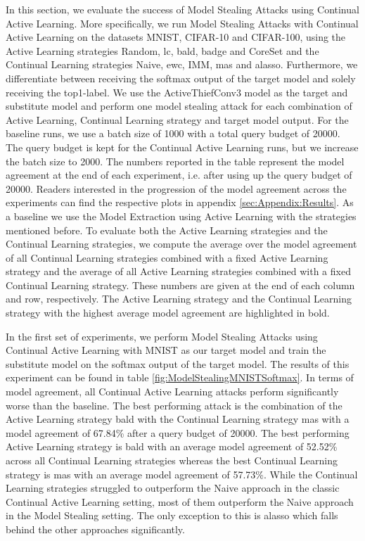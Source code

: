 In this section, we evaluate the success of Model Stealing Attacks using Continual Active Learning. More specifically, we run Model Stealing Attacks with Continual Active Learning on the datasets MNIST, CIFAR-10 and CIFAR-100, using the Active Learning strategies
Random, \gls{lc}, \gls{bald}, \gls{badge} and CoreSet and the Continual Learning strategies Naive, \gls{ewc}, IMM, \gls{mas} and \gls{alasso}. Furthermore, we differentiate between receiving the softmax output of the target model and solely receiving the top1-label. We use the ActiveThiefConv3 model
as the target and substitute model and perform one model stealing attack for each combination of Active Learning, Continual Learning strategy and target model output. For the baseline runs, we use a batch size of 1000 with a total query budget of 20000. The query budget
is kept for the Continual Active Learning runs, but we increase the batch size to 2000. The numbers reported in the table represent the model agreement at the end of each experiment, i.e. after using up the query budget of 20000. Readers interested in the progression of the
model agreement across the experiments can find the respective plots in appendix \ref{sec:Appendix:Results}. As a baseline we use the Model Extraction using Active Learning with the strategies mentioned before. To evaluate both the Active Learning strategies and the Continual
Learning strategies, we compute the average over the model agreement of all Continual Learning strategies combined with a fixed Active Learning strategy and the average of all Active Learning strategies combined with a fixed Continual Learning strategy. These numbers are given
at the end of each column and row, respectively. The Active Learning strategy and the Continual Learning strategy with the highest average model agreement are highlighted in bold. \par
In the first set of experiments, we perform Model Stealing Attacks using Continual Active Learning with MNIST as our target model and train the substitute model on the softmax output of the target model. The results of this experiment can be found in table
\ref{fig:ModelStealingMNISTSoftmax}. In terms of model agreement, all Continual Active Learning attacks perform significantly worse than the baseline. The best performing attack is the combination of the Active Learning strategy \gls{bald} with the Continual Learning strategy
\gls{mas} with a model agreement of 67.84\% after a query budget of 20000. The best performing Active Learning strategy is \gls{bald} with an average model agreement of 52.52\% across all Continual Learning strategies whereas the best Continual Learning strategy is \gls{mas} with an average
model agreement of 57.73\%. While the Continual Learning strategies struggled to outperform the Naive approach in the classic Continual Active Learning setting, most of them outperform the Naive approach in the Model Stealing setting. The only exception to this is \gls{alasso} which
falls behind the other approaches significantly. \par 

